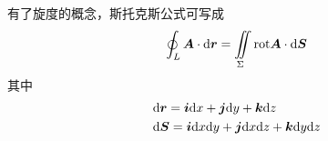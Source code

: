 有了旋度的概念，斯托克斯公式可写成
\begin{equation*}
    \oint_{L}\bm{A}\cdot\mathrm{d} \bm{r}=\iint \limits_{\Sigma}\text{rot}\bm{A}\cdot\mathrm{d} \bm{S}
\end{equation*}
其中
\begin{align*}
    & \mathrm{d} \bm{r}=\bm{i}\mathrm{d} x+\bm{j}\mathrm{d} y+\bm{k}\mathrm{d} z \\
    & \mathrm{d} \bm{S}=\bm{i}\mathrm{d} x\mathrm{d} y+\bm{j}\mathrm{d} x\mathrm{d} z+\bm{k}\mathrm{d} y\mathrm{d} z
\end{align*}
